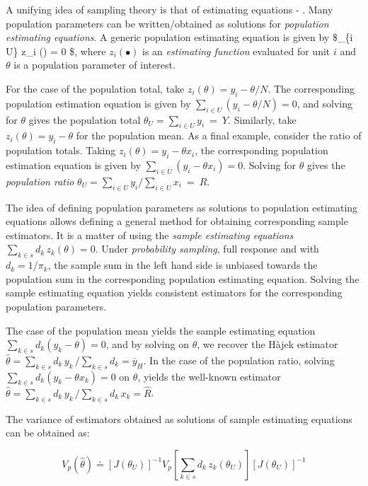 \documentclass[
  12pt,
]{book}
\begin{document}
A unifying idea of sampling theory is that of estimating equations - \citet{Binder1983}. Many population parameters can be written/obtained as solutions for \emph{population estimating equations}. A generic population estimating equation is given by \$\sum\_\{i \in U\} z\_i (\theta) = 0 \$, where \(z_i(\bullet)\) is an \emph{estimating function} evaluated for unit \(i\) and \(\theta\) is a population parameter of interest.

For the case of the population total, take \(z_i(\theta) = y_i - \theta / N\). The corresponding population estimation equation is given by \(\sum _{i \in U} (y_i - \theta / N) = 0\), and solving for \(\theta\) gives the population total \(\theta_U = \sum _{i \in U} y_i \ = \ Y\). Similarly, take \(z_i(\theta) = y_i - \theta\) for the population mean. As a final example, consider the ratio of population totals. Taking \(z_i(\theta) = y_i - \theta x_i\), the corresponding population estimation equation is given by \(\sum _{i \in U} (y_i - \theta x_i) = 0\). Solving for \(\theta\) gives the \emph{population ratio} \(\theta_U = \sum _{i \in U} y_i / \sum _{i \in U} x_i \ = \ R\).

The idea of defining population parameters as solutions to population estimating equations allows defining a general method for obtaining corresponding sample estimators. It is a matter of using the \emph{sample estimating equations} \(\sum _{k \in s} d_k \, z_k (\theta) = 0\). Under \emph{probability sampling}, full response and with \(d_k = 1 / \pi_k\), the sample sum in the left hand side is unbiased towards the population sum in the corresponding population estimating equation. Solving the sample estimating equation yields consistent estimators for the corresponding population parameters.

The case of the population mean yields the sample estimating equation \(\sum _{k \in s} d_k (y_k - \theta) = 0\), and by solving on \(\theta\), we recover the Hàjek estimator \(\widehat \theta = \sum _{k \in s} d_k \, y_k \, / \sum _{k \in s} d_k = \overline y_H\). In the case of the population ratio, solving \(\sum _{k \in s} d_k (y_k - \theta x_k) = 0\) on \(\theta\), yields the well-known estimator \(\widehat \theta = \sum _{k \in s} d_k \, y_k \, / \sum _{k \in s} d_k \, x_k = \widehat R\).

The variance of estimators obtained as solutions of sample estimating equations can be obtained as:

\[
V_p (\widehat \theta) \doteq \left[ J (\theta_U) \right] ^{-1} V_p \left[ \sum _{k \in s} d_k \, z_k (\theta_U) \right] \left[ J (\theta_U) \right] ^{-1}
\]
\end{document}
